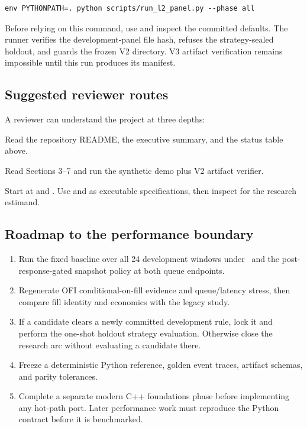 \begin{lstlisting}[style=projectcode]
env PYTHONPATH=. python scripts/run_l2_panel.py --phase all
\end{lstlisting}

Before relying on this command, use  and inspect the committed
defaults. The runner verifies the development-panel file hash, refuses the
strategy-sealed holdout, and guards the frozen V2 directory. V3 artifact
verification remains impossible until this run produces its manifest.

\subsection{Suggested reviewer routes}

A reviewer can understand the project at three depths:

\begin{description}[leftmargin=6.2em,style=nextline]
  \item[Five minutes] Read the repository README, the executive summary, and
        the status table above.
  \item[Thirty minutes] Read Sections 3--7 and run the synthetic demo plus V2
        artifact verifier.
  \item[Code review] Start at  and
        . Use
         and
         as executable specifications, then
        inspect  for the research estimand.
\end{description}

\subsection{Roadmap to the performance boundary}

\begin{enumerate}
  \item Run the fixed baseline over all 24 development windows under
        \CurrentModel\ and the post-response-gated snapshot policy at both queue
        endpoints.
  \item Regenerate OFI conditional-on-fill evidence and queue/latency stress,
        then compare fill identity and economics with the legacy study.
  \item If a candidate clears a newly committed development rule, lock it and
        perform the one-shot holdout strategy evaluation. Otherwise close the
        research arc without evaluating a candidate there.
  \item Freeze a deterministic Python reference, golden event traces, artifact
        schemas, and parity tolerances.
  \item Complete a separate modern C++ foundations phase before implementing
        any hot-path port. Later performance work must reproduce the Python
        contract before it is benchmarked.
\end{enumerate}

